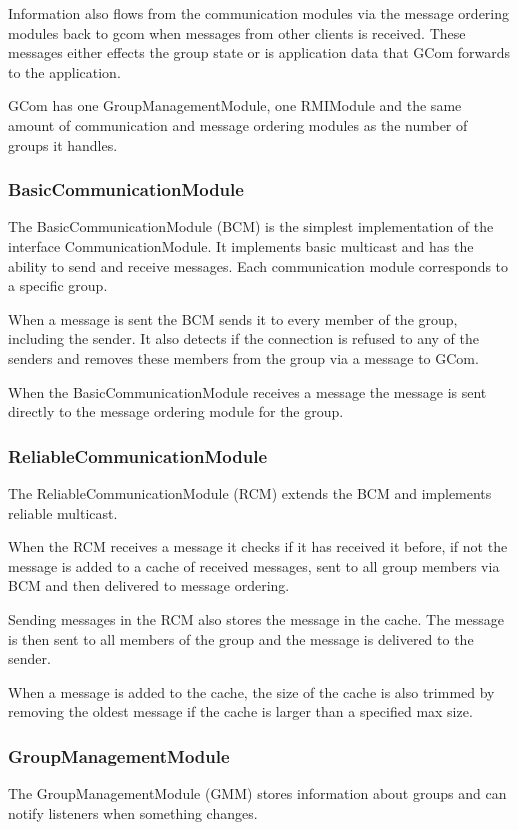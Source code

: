 \documentclass[english]{article}
\begin{document}
Information also flows from the communication modules via the message ordering modules back to gcom when messages from other clients is received. These messages either effects the group state or is application data that GCom forwards to the application. 

GCom has one GroupManagementModule, one RMIModule and the same amount of communication and message ordering modules as the number of groups it handles.

\subsubsection{BasicCommunicationModule}
The BasicCommunicationModule (BCM) is the simplest implementation of the interface CommunicationModule. It implements basic multicast and has the ability to send and receive messages. Each communication module corresponds to a specific group. 

When a message is sent the BCM sends it to every member of the group, including the sender. It also detects if the connection is refused to any of the senders and removes these members from the group via a message to GCom.

When the BasicCommunicationModule receives a message the message is sent directly to the message ordering module for the group.

\subsubsection{ReliableCommunicationModule}
The ReliableCommunicationModule (RCM) extends the BCM and implements reliable multicast.

When the RCM receives a message it checks if it has received it before, if not the message is added to a cache of received messages, sent to all group members via BCM and then delivered to message ordering.

Sending messages in the RCM also stores the message in the cache. The message is then sent to all members of the group and the message is delivered to the sender.

When a message is added to the cache, the size of the cache is also trimmed by removing the oldest message if the cache is larger than a specified max size.

\subsubsection{GroupManagementModule}
The GroupManagementModule (GMM) stores information about groups and can notify listeners when something changes.
\end{document}
